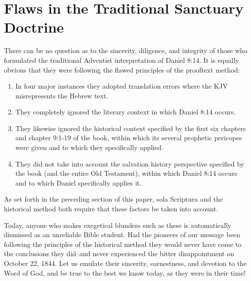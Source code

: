 \chapter{Flaws in the Traditional Sanctuary Doctrine}
\label{ch:flaws}

There can be no question as to the sincerity, diligence, and integrity of
those who formulated the traditional Adventist interpretation of
Daniel 8:14. It is equally obvious that they were following the flawed
principles of the prooftext method:
\begin{enumerate}
	\item In four major instances they adopted
translation errors where the KJV misrepresents the Hebrew text. 
	\item They
completely ignored the literary context in which Daniel 8:14 occurs.
	\item They likewise ignored the historical context specified by the first six
chapters and chapter 9:1-19 of the book, within which its several prophetic
pericopes were given and to which they specifically applied.
	\item They did not take into account the salvation history perspective 
specified by the 
book (and the entire Old Testament), within which Daniel 8:14 occurs and
to which Daniel specifically applies it.
\end{enumerate}
As set forth in the preceding
section of this paper, sola Scriptura and the historical method both require
that these factors be taken into account.

Today, anyone who makes exegetical blunders such as these is automatically
dismissed as an unreliable Bible student. Had the pioneers of our message
been following the principles of the historical method they would never have
come to the conclusions they did--and never experienced the bitter
disappointment on October 22, 1844. Let us emulate their sincerity,
earnestness, and devotion to the Word of God, and be true to the best we
know today, as they were in their time!

